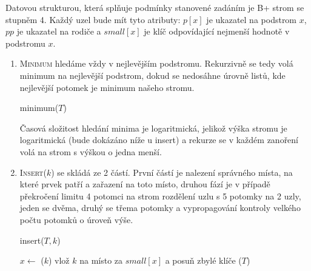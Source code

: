 \documentclass[12pt]{iv003}
\begin{document}

Datovou strukturou, která splňuje podmínky stanovené zadáním je B+ strom se stupněm 4.
Každý uzel bude mít tyto atributy: $p[x]$ je ukazatel na podstrom $x$, $pp$ je ukazatel na rodiče a $small[x]$ je klíč odpovídající nejmenší hodnotě v podstromu $x$.

\begin{enumerate}
	\item \textsc{Minimum} hledáme vždy v nejlevějším podstromu. Rekurzivně se tedy volá minimum na nejlevější podstrom, dokud se nedosáhne úrovně listů, kde nejlevější potomek je minimum našeho stromu.\\
	
	\begin{procedure}[H]
		\caption{minimum($T$) }
		 {
			 
		}
	\end{procedure}
	Časová složitost hledání minima je logaritmická, jelikož výška stromu je logaritmická (bude dokázáno níže u insert) a rekurze se v každém zanoření volá na strom s výškou o jedna menší.
	\item \textsc{Insert}($k$) se skládá ze 2 částí. První částí je nalezení správného místa, na které prvek patří a zařazení na toto místo, druhou fází je v případě překročení limitu 4 potomci na strom rozdělení uzlu s 5 potomky na 2 uzly, jeden se dvěma, druhý se třema potomky a vypropagování kontroly velkého počtu potomků o úroveň výše.\\
	
	\begin{procedure}[H]
		\caption{insert($T, k$) }
		\Output{}
		$x \leftarrow $ \ffselectkey($k$) 
		 {
			vlož $k$ na místo za $small[x]$ a posuň zbylé klíče \;
			\ffcontrolnode($T$) \;
		}
	\end{procedure}
	

\end{enumerate}
\end{document}
